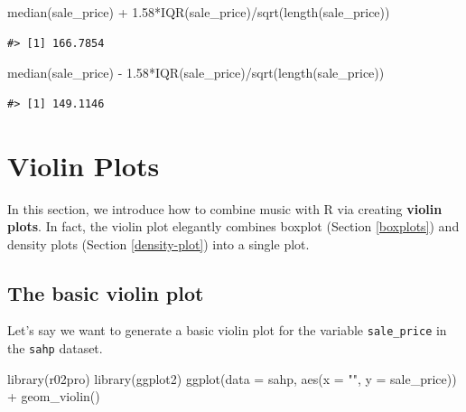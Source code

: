 \documentclass[
]{book}
\newenvironment{Shaded}{\begin{snugshade}}{\end{snugshade}}
\newcommand{\AttributeTok}[1]{\textcolor[rgb]{0.77,0.63,0.00}{#1}}
\newcommand{\FloatTok}[1]{\textcolor[rgb]{0.00,0.00,0.81}{#1}}
\newcommand{\FunctionTok}[1]{\textcolor[rgb]{0.00,0.00,0.00}{#1}}
\newcommand{\NormalTok}[1]{#1}
\newcommand{\SpecialCharTok}[1]{\textcolor[rgb]{0.00,0.00,0.00}{#1}}
\newcommand{\StringTok}[1]{\textcolor[rgb]{0.31,0.60,0.02}{#1}}
\begin{document}
\begin{Shaded}
\begin{Highlighting}[]
\FunctionTok{median}\NormalTok{(sale\_price) }\SpecialCharTok{+} \FloatTok{1.58}\SpecialCharTok{*}\FunctionTok{IQR}\NormalTok{(sale\_price)}\SpecialCharTok{/}\FunctionTok{sqrt}\NormalTok{(}\FunctionTok{length}\NormalTok{(sale\_price))}
\end{Highlighting}
\end{Shaded}

\begin{verbatim}
#> [1] 166.7854
\end{verbatim}

\begin{Shaded}
\begin{Highlighting}[]
\FunctionTok{median}\NormalTok{(sale\_price) }\SpecialCharTok{{-}} \FloatTok{1.58}\SpecialCharTok{*}\FunctionTok{IQR}\NormalTok{(sale\_price)}\SpecialCharTok{/}\FunctionTok{sqrt}\NormalTok{(}\FunctionTok{length}\NormalTok{(sale\_price))}
\end{Highlighting}
\end{Shaded}

\begin{verbatim}
#> [1] 149.1146
\end{verbatim}

\hypertarget{violin}{%
\section{Violin Plots}\label{violin}}

In this section, we introduce how to combine music with R via creating \textbf{violin plots}. In fact, the violin plot elegantly combines boxplot (Section \ref{boxplots}) and density plots (Section \ref{density-plot}) into a single plot.

\hypertarget{the-basic-violin-plot}{%
\subsection{The basic violin plot}\label{the-basic-violin-plot}}

Let's say we want to generate a basic violin plot for the variable \texttt{sale\_price} in the \texttt{sahp} dataset.

\begin{Shaded}
\begin{Highlighting}[]
\FunctionTok{library}\NormalTok{(r02pro)}
\FunctionTok{library}\NormalTok{(ggplot2)}
\FunctionTok{ggplot}\NormalTok{(}\AttributeTok{data =}\NormalTok{ sahp, }\FunctionTok{aes}\NormalTok{(}\AttributeTok{x =} \StringTok{""}\NormalTok{, }\AttributeTok{y =}\NormalTok{ sale\_price)) }\SpecialCharTok{+} \FunctionTok{geom\_violin}\NormalTok{()}
\end{Highlighting}
\end{Shaded}
\end{document}

